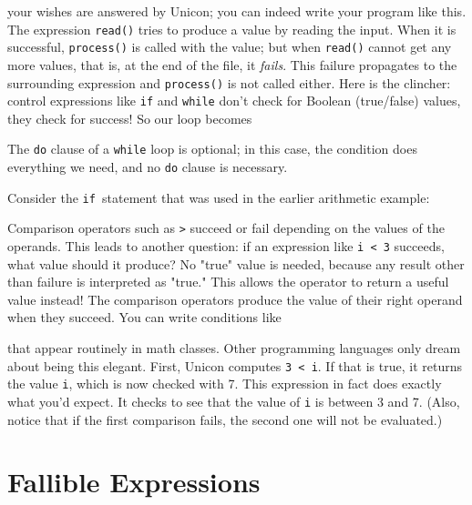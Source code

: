 
\noindent
your wishes are answered by Unicon; you can indeed write your
program like this. The expression \texttt{read()} tries to produce a
value by reading the input. When it is successful, \texttt{process()}
is called with the value; but when \texttt{read()} cannot get any more
values, that is, at the end of the file, it \textit{fails}. This
failure propagates to the surrounding expression and \texttt{process()}
is not called either. Here is the clincher: control expressions like
\texttt{if} and \texttt{while} don't check for Boolean
(true/false) values, they check for success! So our loop
becomes


The \texttt{do} clause of a \texttt{while} loop is
optional; in this case, the condition does everything
we need, and no \texttt{do} clause is necessary.

Consider the \texttt{if}\texttt{ }statement that was
used in the earlier arithmetic example:


Comparison operators such as \texttt{{\textgreater}} succeed or fail
depending on the values of the operands. This leads to another
question: if an expression like \texttt{i {\textless} 3} succeeds, what
value should it produce? No "true" value is
needed, because any result other than failure is interpreted as
"true." This allows the operator to return
a useful value instead! The comparison
operators produce the value of their right operand when they succeed.
You can write conditions like


\noindent
that appear routinely in math classes. Other programming languages only
dream about being this elegant. First, Unicon computes \texttt{3
{\textless} i}. If that is true, it returns the value \texttt{i}, which
is now checked with 7. This expression in fact does exactly what
you'd expect. It checks to see that the value of
\texttt{i} is between 3 and 7. (Also, notice that if the first
comparison fails, the second one will not be evaluated.)

\section{Fallible Expressions}

